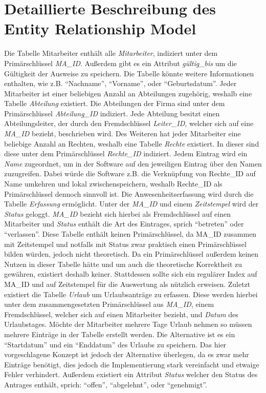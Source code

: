 \section{Detaillierte Beschreibung des Entity Relationship Model}
Die Tabelle Mitarbeiter enthält alle \textit{Mitarbeiter}, indiziert unter dem Primärschlüssel \textit{MA_ID}. Außerdem gibt es ein Attribut \textit{gültig_bis} um die Gültigkeit der Ausweise zu speichern. Die Tabelle könnte weitere Informationen enthalten, wie z.B. \enquote{Nachname}, \enquote{Vorname}, oder \enquote{Geburtsdatum}. \newline
Jeder Mitarbeiter ist einer beliebigen Anzahl an Abteilungen zugehörig, weshalb eine Tabelle \textit{Abteilung} existiert. Die Abteilungen der Firma sind unter dem Primärschlüssel \textit{Abteilung_ID} indiziert. Jede Abteilung besitzt einen Abteilungsleiter, der durch den Fremdschlüssel \textit{Leiter_ID}, welcher sich auf eine \textit{MA_ID} bezieht, beschrieben wird. \newline
Des Weiteren hat jeder Mitarbeiter eine beliebige Anzahl an Rechten, weshalb eine Tabelle \textit{Rechte} existiert. In dieser sind diese unter dem Primärschlüssel \textit{Rechte_ID} indiziert. Jedem Eintrag wird ein \textit{Name} zugeordnet, um in der Software auf den jeweiligen Eintrag über den Namen zuzugreifen. Dabei würde die Software z.B. die Verknüpfung von Rechte_ID auf Name umkehren und lokal zwischenspeichern, weshalb Rechte_ID als Primärschlüssel dennoch sinnvoll ist. \newline
Die Anwesenheitserfassung wird durch die Tabelle \textit{Erfassung} ermöglicht. Unter der \textit{MA_ID} und einem \textit{Zeitstempel} wird der \textit{Status} geloggt. \textit{MA_ID} bezieht sich hierbei als Fremdschlüssel auf einen Mitarbeiter und \textit{Status} enthält die Art des Eintrages, sprich \enquote{betreten} oder \enquote{verlassen}. Diese Tabelle enthält keinen Primärschlüssel, da MA_ID zusammen mit Zeitstempel und notfalls mit Status zwar praktisch einen Primärschlüssel bilden würden, jedoch nicht theoretisch. Da ein Primärschlüssel außerdem keinen Nutzen in dieser Tabelle hätte und um auch die theoretische Korrektheit zu gewähren, existiert deshalb keiner. Stattdessen sollte sich ein regulärer Index auf MA_ID und auf Zeitstempel für die Auswertung als nützlich erweisen. \newline
Zuletzt existiert die Tabelle \textit{Urlaub} um Urlaubsanträge zu erfassen. Diese werden hierbei unter dem zusammengesetzten Primärschlüssel aus \textit{MA_ID}, einem Fremdschlüssel, welcher sich auf einen Mitarbeiter bezieht, und \textit{Datum} des Urlaubstages. Möchte der Mitarbeiter mehrere Tage Urlaub nehmen so müssen mehrere Einträge in der Tabelle erstellt werden. Die Alternative ist es ein \enquote{Startdatum} und ein \enquote{Enddatum} des Urlaubs zu speichern. Das hier vorgeschlagene Konzept ist jedoch der Alternative überlegen, da es zwar mehr Einträge benötigt, dies jedoch die Implementierung stark vereinfacht und etwaige Fehler verhindert. Außerdem existiert ein Attribut \textit{Status} welcher den Status des Antrages enthält, sprich: \enquote{offen}, \enquote{abgelehnt}, oder \enquote{genehmigt}.

